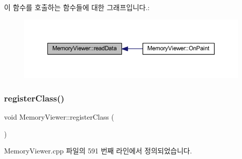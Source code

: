 이 함수를 호출하는 함수들에 대한 그래프입니다.\+:
\nopagebreak
\begin{figure}[H]
\begin{center}
\leavevmode
\includegraphics[width=350pt]{class_memory_viewer_a2e1b969cce8f4d60912f6b640febc54a_icgraph}
\end{center}
\end{figure}
\mbox{\label{class_memory_viewer_af3d30272c691967ea6a4cc37ceb87595}} 
\subsubsection{\texorpdfstring{register\+Class()}{registerClass()}}
{\footnotesize\ttfamily void Memory\+Viewer\+::register\+Class (\begin{DoxyParamCaption}{ }\end{DoxyParamCaption})}



Memory\+Viewer.\+cpp 파일의 591 번째 라인에서 정의되었습니다.


